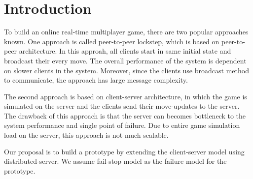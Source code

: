 
\section{Introduction}
\label{sec:Intro}

To build an online real-time  multiplayer game, there are two popular approaches known. One approach is called peer-to-peer lockstep, which is based on peer-to-peer architecture. In this approah, all clients start in same initial state and broadcast their every move. The overall performance of the system is dependent on slower clients in the system. Moreover, since the clients use broadcast method to communicate, the approach has large message complexity.

The second approach is based on client-server architecture, in which the game is simulated on the server and the clients send their move-updates to the server. The drawback of this approach is that the server can becomes bottleneck to the system performance and single point of failure. Due to entire game simulation load on the server, this approach is not much scalable.
	
Our proposal is to build a prototype by extending the client-server model using distributed-server. We assume fail-stop model as the failure model for the prototype.

